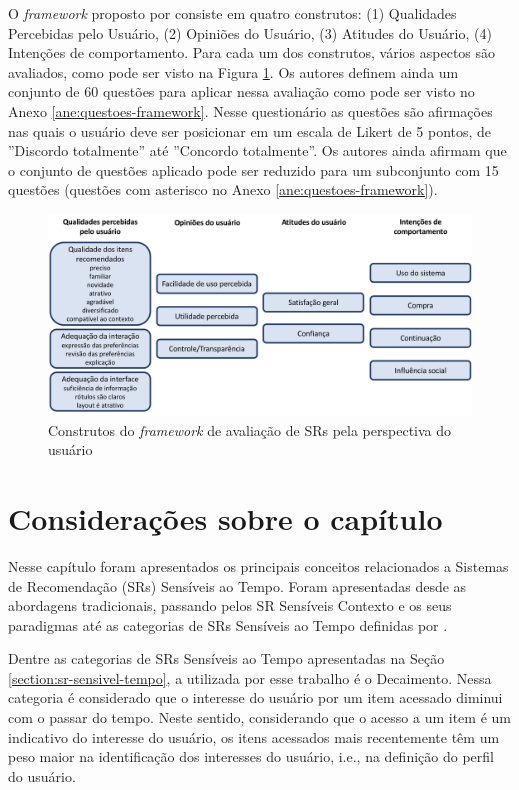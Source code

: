 O \textit{framework} proposto por  consiste em quatro construtos: (1) Qualidades Percebidas pelo
Usuário, (2) Opiniões do Usuário, (3) Atitudes do Usuário, (4) Intenções de comportamento.
Para cada um dos construtos, vários aspectos são avaliados, como pode ser visto na Figura \ref{fig:resque-framework}.
Os autores definem ainda um conjunto de 60 questões para aplicar nessa avaliação como pode ser visto no Anexo
\ref{ane:questoes-framework}. Nesse questionário as questões são afirmações nas quais o usuário deve ser posicionar em
um escala de Likert de 5 pontos, de ''Discordo totalmente'' até ''Concordo totalmente''. Os autores ainda afirmam que o
conjunto de questões aplicado pode ser reduzido para um subconjunto com 15 questões (questões com asterisco no Anexo
\ref{ane:questoes-framework}).

\begin{figure}[htb]
  \caption{\label{fig:resque-framework}Construtos do \textit{framework} de avaliação de SRs pela perspectiva do usuário}
  \begin{center}
      \includegraphics[scale=0.4]{./Figuras/resque-framework-traduzido.png}
  \end{center}
\end{figure}

\section{Considerações sobre o capítulo}

Nesse capítulo foram apresentados os principais conceitos relacionados a Sistemas de Recomendação (SRs) Sensíveis ao Tempo.
Foram apresentadas desde as abordagens tradicionais, passando pelos SR Sensíveis Contexto e os seus paradigmas até as
categorias de SRs Sensíveis ao Tempo definidas por .

Dentre as categorias de SRs Sensíveis ao Tempo apresentadas na Seção \ref{section:sr-sensivel-tempo}, a utilizada por esse
trabalho é o Decaimento. Nessa categoria é considerado que o interesse do usuário por um item acessado diminui com o passar
do tempo. Neste sentido, considerando que o acesso a um item é um indicativo do interesse do usuário, os itens acessados
mais recentemente têm um peso maior na identificação dos interesses do usuário, i.e., na definição do perfil do usuário.

